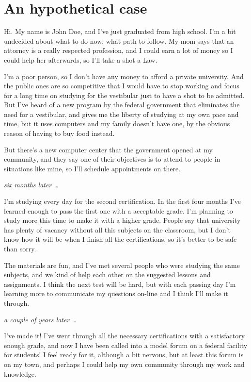 \section{An hypothetical case}

Hi. My name is John Doe, and I've just graduated from high school. I'm a bit
undecided about what to do now, what path to follow. My mom  says that an
attorney is a really respected profession, and I could earn a lot of money so I
could help her afterwards, so I'll take a shot a Law.

I'm a poor person, so I don't have any money to afford a private university. And
the public ones are so competitive that I would have to stop working and focus
for a long time on studying for the vestibular just to have a shot to be
admitted. But I've heard of a new program by the federal government that
eliminates the need for a vestibular, and gives me the liberty of studying at my
own pace and time, but it uses computers and my family doesn't have one, by the
obvious reason of having to buy food instead.

But there's a new computer center that the government opened at my community,
and they say one of their objectives is to attend to people in situations like
mine, so I'll schedule appointments on there.

\textit{six months later \ldots }

I'm studying every day for the second certification. In the first four months
I've learned enough to pass the first one with a acceptable grade. I'm planning
to study more this time to make it with a higher grade. People say that
university has plenty of vacancy without all this subjects on the classroom, but
I don't know how it will be when I finish all the certifications, so it's better
to be safe than sorry.

The materials are fun, and I've met several people who were studying the same
subjects, and we kind of help each other on the suggested lessons and
assignments. I think the next test will be hard, but with each passing day I'm
learning more to communicate my questions on-line and I think I'll make it
through.

\textit{a couple of years later \ldots }

I've made it! I've went through all the necessary certifications with a
satisfactory enough grade, and now I have been called into a model forum on a
federal facility for students! I feel ready for it, although a bit nervous, 
but at least this forum is on my town, and perhaps I could help my own community
through my work and knowledge.

